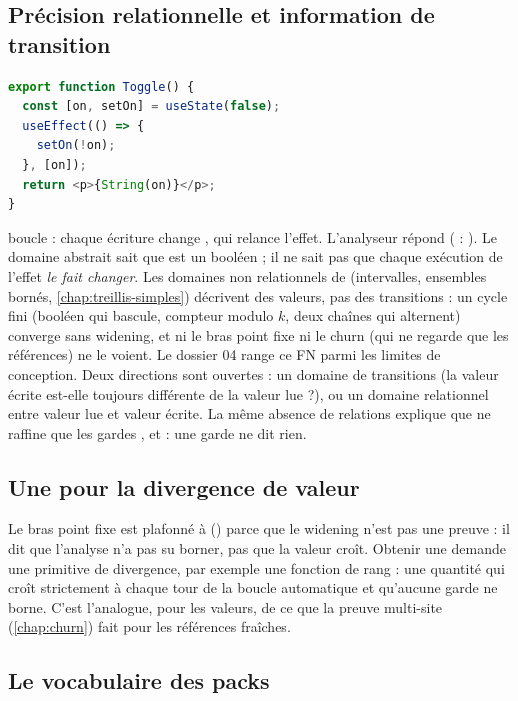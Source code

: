 \subsection{Précision relationnelle et information de transition}

\begin{lstlisting}[language=TypeScript,caption={\file{/tmp/r27/persp/Persp.tsx}, composant \code{Toggle}}]
export function Toggle() {
  const [on, setOn] = useState(false);
  useEffect(() => {
    setOn(!on);
  }, [on]);
  return <p>{String(on)}</p>;
}
\end{lstlisting}

 boucle : chaque écriture change , qui relance l'effet. L'analyseur répond  ( : ). Le domaine abstrait sait que  est un booléen ; il ne sait pas que chaque exécution de l'effet \emph{le fait changer}. Les domaines non relationnels de \reactant{} (intervalles, ensembles bornés, \cref{chap:treillis-simples}) décrivent des valeurs, pas des transitions : un cycle fini (booléen qui bascule, compteur modulo $k$, deux chaînes qui alternent) converge sans widening, et ni le bras point fixe ni le churn (qui ne regarde que les références) ne le voient. Le dossier 04 range ce FN parmi les limites de conception. Deux directions sont ouvertes : un domaine de transitions (la valeur écrite est-elle toujours différente de la valeur lue ?), ou un domaine relationnel entre valeur lue et valeur écrite. La même absence de relations explique que  ne raffine que les gardes ,  et  : une garde  ne dit rien.

\subsection{Une \Error{} pour la divergence de valeur}

Le bras point fixe est plafonné à \Warning{} () parce que le widening n'est pas une preuve : il dit que l'analyse n'a pas su borner, pas que la valeur croît. Obtenir une \Error{} demande une primitive  de divergence, par exemple une fonction de rang : une quantité qui croît strictement à chaque tour de la boucle automatique et qu'aucune garde ne borne. C'est l'analogue, pour les valeurs, de ce que la preuve multi-site (\cref{chap:churn}) fait pour les références fraîches.

\subsection{Le vocabulaire des packs}

